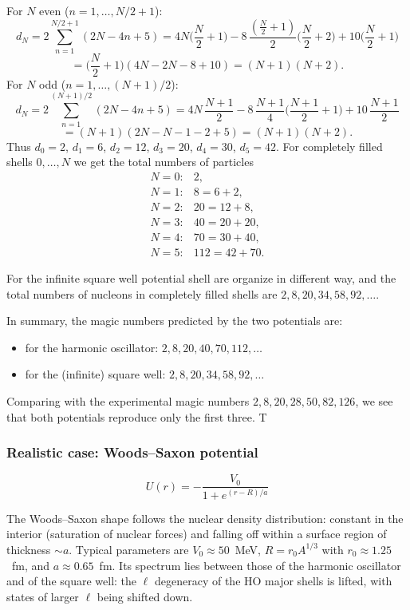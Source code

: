\documentclass[11pt,a4paper]{article}
\begin{document}
\noindent
For
$N$ even ($n=1,\dots,N/2+1$):
\[
d_N=2\sum_{n=1}^{N/2+1}(2N-4n+5)
=4N\Big(\frac N2+1\Big)-8\,\frac{(\frac N2+1)}{2}\Big(\frac N2+2\Big)+10\Big(\frac N2+1\Big)
\]
\[
=\Big(\frac N2+1\Big)(4N-2N-8+10)=(N+1)(N+2).
\]
For
$N$ odd ($n=1,\dots,(N+1)/2$):
\[
d_N=2\sum_{n=1}^{(N+1)/2}(2N-4n+5)
=4N\,\frac{N+1}{2}-8\,\frac{N+1}{4}\Big(\frac{N+1}{2}+1\Big)+10\,\frac{N+1}{2}
\]
\[
=(N+1)(2N-N-1-2+5)=(N+1)(N+2).
\]
Thus $d_0=2$, $d_1=6$, $d_2=12$, $d_3=20$, $d_4=30$, $d_5=42$. For completely filled shells $0,\dots,N$ we get the total numbers of particles
\[
\begin{array}{ll}
N=0: & 2,\\
N=1: & 8=6+2,\\
N=2: & 20=12+8,\\
N=3: & 40=20+20,\\
N=4: & 70=30+40,\\
N=5: & 112=42+70.
\end{array}
\]

For the infinite square well potential shell are organize in different way, and the total numbers of nucleons in completely filled shells are $2,8,20,34,58,92,\dots$.

In summary, the magic numbers predicted by the two potentials are:
\begin{itemize}
\item for the harmonic oscillator: $2,8,20,40,70,112,\dots$
\item for the (infinite) square well: $2,8,20,34,58,92,\dots$
\end{itemize}

Comparing with the experimental magic numbers $2,8,20,28,50,82,126$, we see that both potentials reproduce only the first three. T

\subsubsection*{Realistic case: Woods--Saxon potential}
\[
U(r)=-\frac{V_0}{1+e^{(r-R)/a}}
\]

The Woods--Saxon shape follows the nuclear density distribution: constant in the interior (saturation of nuclear forces) and falling off within a surface region of thickness $\sim a$. Typical parameters are $V_0\approx50$~MeV, $R=r_0A^{1/3}$ with $r_0\approx1.25$~fm, and $a\approx0.65$~fm. Its spectrum lies between those of the harmonic oscillator and of the square well: the $\ell$ degeneracy of the HO major shells is lifted, with states of larger $\ell$ being shifted down.
\end{document}
